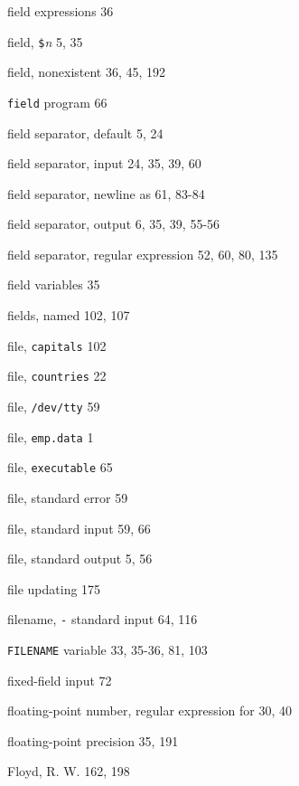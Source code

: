 \begin{multicols}{3}
\hangindent=4pc  field expressions 36

\hangindent=4pc  field, \verb'$'\textit{n} 5, 35

\hangindent=4pc  field, nonexistent 36, 45, 192

\hangindent=4pc  \verb'field' program 66

\hangindent=4pc  field separator, default 5, 24

\hangindent=4pc  field separator, input 24, 35, 39, 60

\hangindent=4pc  field separator, newline as 61, 83-84

\hangindent=4pc  field separator, output 6, 35, 39, 55-56

\hangindent=4pc  
\hangindent=4pc  field separator, regular expression 52, 60, 80, 135

\hangindent=4pc  field variables 35

\hangindent=4pc  fields, named 102, 107

\hangindent=4pc  file, \verb'capitals' 102

\hangindent=4pc  file, \verb'countries' 22

\hangindent=4pc  file, \verb'/dev/tty' 59

\hangindent=4pc  file, \verb'emp.data' 1

\hangindent=4pc  file, \verb'executable' 65

\hangindent=4pc  file, standard error 59

\hangindent=4pc  file, standard input 59, 66

\hangindent=4pc  file, standard output 5, 56

\hangindent=4pc  file updating 175

\hangindent=4pc  filename, \verb'-' standard input 64, 116

\hangindent=4pc  \verb'FILENAME' variable 33, 35-36, 81, 103

\hangindent=4pc  fixed-field input 72

\hangindent=4pc  floating-point number, regular expression for 30, 40

\hangindent=4pc  floating-point precision 35, 191

\hangindent=4pc  Floyd, R. W. 162, 198


\end{multicols}
